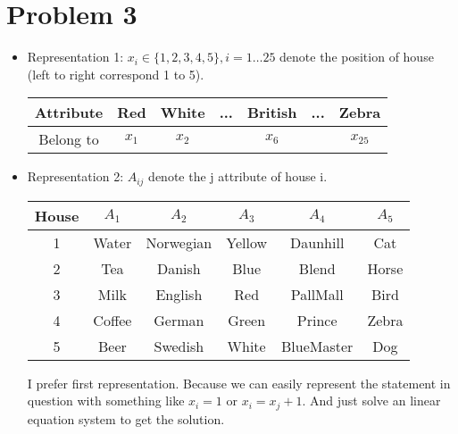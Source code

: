 \documentclass{mcmthesis}
\begin{document}
\section{Problem 3}
\begin{itemize}
	\item Representation 1: $x_i \in \{1,2,3,4,5\}, i=1 \dots 25$ denote the position of house (left to right correspond 1 to 5).
	
	\begin{tabular}{c||c|c||c||c||c||c}
		\hline 
		Attribute & Red & White & ... & British & ... & Zebra \\ 
		\hline 
		Belong to & $x_1$ & $x_2$ &  & $x_6$ &  & $x_{25}$ \\ 
		\hline 
	\end{tabular} 
	\item Representation 2: $A_{ij}$ denote the j attribute of house i.
	
	\begin{tabular}{c||ccccc}
		\hline 
		House&$A_1$&$A_2$&$A_3$&$A_4$&$A_5$\\
		\hline \hline
		1   & Water    & Norwegian  & Yellow             & Daunhill                        & Cat \\
		2   & Tea    & Danish  & Blue             & Blend                        & Horse \\
		3 & Milk   & English & Red              & PallMall                     & Bird  \\
		4  & Coffee & German  & Green            & Prince                       & Zebra \\
		5  & Beer   & Swedish & White & BlueMaster  & Dog \\
		\hline
	\end{tabular} 

	I prefer first representation. Because we can easily represent the statement in question with something like $x_i=1$ or $x_i=x_j+1$. And just solve an linear equation system to get the solution.

\end{itemize}

%
	
\end{document}
